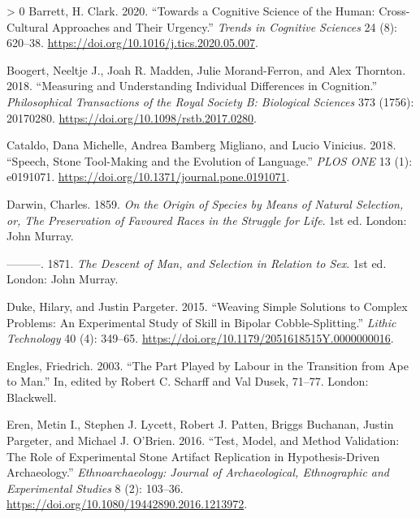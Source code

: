 \documentclass[smallextended]{svjour3}       %
\newlength{\cslhangindent}
\newenvironment{CSLReferences}[3] %
 {%
  \setlength{\parindent}{0pt}
  \ifodd #1 \everypar{\setlength{\hangindent}{\cslhangindent}}\ignorespaces\fi
  \ifnum #2 > 0
  \setlength{\parskip}{#3\baselineskip}
  \fi
 }%
 {}
\begin{document}
\hypertarget{refs}{}
\begin{CSLReferences}{1}{0}
\leavevmode\hypertarget{ref-barrett2020}{}%
Barrett, H. Clark. 2020. {``Towards a Cognitive Science of the Human:
Cross-Cultural Approaches and Their Urgency.''} \emph{Trends in
Cognitive Sciences} 24 (8): 620--38.
\url{https://doi.org/10.1016/j.tics.2020.05.007}.

\leavevmode\hypertarget{ref-boogert2018}{}%
Boogert, Neeltje J., Joah R. Madden, Julie Morand-Ferron, and Alex
Thornton. 2018. {``Measuring and Understanding Individual Differences in
Cognition.''} \emph{Philosophical Transactions of the Royal Society B:
Biological Sciences} 373 (1756): 20170280.
\url{https://doi.org/10.1098/rstb.2017.0280}.

\leavevmode\hypertarget{ref-cataldo2018}{}%
Cataldo, Dana Michelle, Andrea Bamberg Migliano, and Lucio Vinicius.
2018. {``Speech, Stone Tool-Making and the Evolution of Language.''}
\emph{PLOS ONE} 13 (1): e0191071.
\url{https://doi.org/10.1371/journal.pone.0191071}.

\leavevmode\hypertarget{ref-darwin1859}{}%
Darwin, Charles. 1859. \emph{On the Origin of Species by Means of
Natural Selection, or, The Preservation of Favoured Races in the
Struggle for Life}. 1st ed. London: John Murray.

\leavevmode\hypertarget{ref-darwin1871}{}%
---------. 1871. \emph{The Descent of Man, and Selection in Relation to
Sex}. 1st ed. London: John Murray.

\leavevmode\hypertarget{ref-duke2015}{}%
Duke, Hilary, and Justin Pargeter. 2015. {``Weaving Simple Solutions to
Complex Problems: An Experimental Study of Skill in Bipolar
Cobble-Splitting.''} \emph{Lithic Technology} 40 (4): 349--65.
\url{https://doi.org/10.1179/2051618515Y.0000000016}.

\leavevmode\hypertarget{ref-engles2003}{}%
Engles, Friedrich. 2003. {``The Part Played by Labour in the Transition
from Ape to Man.''} In, edited by Robert C. Scharff and Val Dusek,
71--77. London: Blackwell.

\leavevmode\hypertarget{ref-eren2016}{}%
Eren, Metin I., Stephen J. Lycett, Robert J. Patten, Briggs Buchanan,
Justin Pargeter, and Michael J. O'Brien. 2016. {``Test, Model, and
Method Validation: The Role of Experimental Stone Artifact Replication
in Hypothesis-Driven Archaeology.''} \emph{Ethnoarchaeology: Journal of
Archaeological, Ethnographic and Experimental Studies} 8 (2): 103--36.
\url{https://doi.org/10.1080/19442890.2016.1213972}.


\end{CSLReferences}
\end{document}
